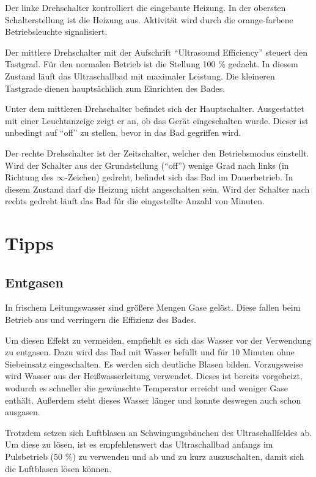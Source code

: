 \documentclass{\basedir/fablab-document}
\begin{document}
Der linke Drehschalter kontrolliert die eingebaute Heizung.
In der obersten Schalterstellung ist die Heizung aus.
Aktivität wird durch die orange-farbene Betriebsleuchte signalisiert.

Der mittlere Drehschalter mit der Aufschrift \enquote{Ultrasound Efficiency} steuert den Tastgrad.
Für den normalen Betrieb ist die Stellung 100 \% gedacht.
In diesem Zustand läuft das Ultraschallbad mit maximaler Leistung.
Die kleineren Tastgrade dienen hauptsächlich zum Einrichten des Bades.

Unter dem mittleren Drehschalter befindet sich der Hauptschalter.
Ausgestattet mit einer Leuchtanzeige zeigt er an, ob das Gerät eingeschalten wurde.
Dieser ist unbedingt auf \enquote{off} zu stellen, bevor in das Bad gegriffen wird.

Der rechte Drehschalter ist der Zeitschalter, welcher den Betriebsmodus einstellt.
Wird der Schalter aus der Grundstellung (\enquote{off}) wenige Grad nach links (in Richtung des $\infty$-Zeichen) gedreht, befindet sich das Bad im Dauerbetrieb.
In diesem Zustand darf die Heizung nicht angeschalten sein.
Wird der Schalter nach rechts gedreht läuft das Bad für die eingestellte Anzahl von Minuten.


\section{Tipps}
\subsection{Entgasen}
In frischem Leitungswasser sind größere Mengen Gase gelöst.
Diese fallen beim Betrieb aus und verringern die Effizienz des Bades.

Um diesen Effekt zu vermeiden, empfiehlt es sich das Wasser vor der Verwendung zu entgasen.
Dazu wird das Bad mit Wasser befüllt und für 10 Minuten ohne Siebeinsatz eingeschalten.
Es werden sich deutliche Blasen bilden.
Vorzugsweise wird Wasser aus der Heißwasserleitung verwendet.
Dieses ist bereits vorgeheizt, wodurch es schneller die gewünschte Temperatur erreicht und weniger Gase enthält.
Außerdem steht dieses Wasser länger und konnte deswegen auch schon ausgasen.

Trotzdem setzen sich Luftblasen an Schwingungsbäuchen des Ultraschallfeldes ab.
Um diese zu lösen, ist es empfehlenswert das Ultraschallbad anfangs im Pulsbetrieb (50 \%) zu verwenden und ab und zu kurz auszuschalten, damit sich die Luftblasen lösen können.
\end{document}
